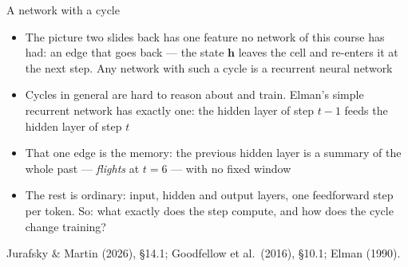 \documentclass[aspectratio=169, 11pt]{beamer}
\newcommand{\srcline}[1]{%
  \par\vspace{0.25em}%
  {\scriptsize\color{mcMuted}\hfill #1\par}}
\newcommand{\src}[3]{}      %
\begin{document}
\begin{frame}{A network with a cycle}
  \src{jurafsky_slp3}{section}{14.1}
  \src{goodfellow2016}{section}{10.1}
  \src{elman1990}{page}{182-184}
  \vspace{-0.2em}
  {\footnotesize
  \begin{itemize}\itemsep0.25em
    \item The picture two slides back has one feature no network of
          this course has had: an edge that goes \alert{back} --- the state
          $\mathbf{h}$ leaves the cell and re-enters it at the next step.
          Any network with such a cycle is a \alert{recurrent neural network}
    \item Cycles in general are hard to reason about and train. Elman's
          \alert{simple recurrent network} has exactly one: the hidden
          layer of step $t-1$ feeds the hidden layer of step $t$
    \item That one edge is the memory: the previous hidden layer is a
          summary of the whole past --- \emph{flights} at $t = 6$ --- with
          no fixed window
    \item The rest is ordinary: input, hidden and output layers, one
          feedforward step per token. So: what exactly does the step
          compute, and how does the cycle change training?
  \end{itemize}}
  \srcline{Jurafsky \& Martin (2026), \S14.1; Goodfellow et al.\ (2016), \S10.1; Elman (1990).}
\end{frame}
\end{document}
